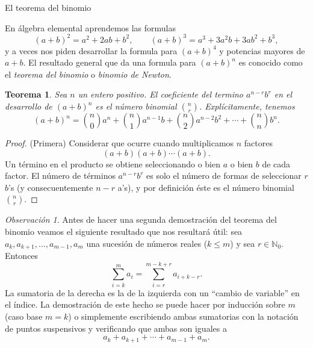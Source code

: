 \documentclass[11pt,spanish,makeidx]{amsbook}
\newtheorem{teorema}{Teorema}[section]
\theoremstyle{definition}
\theoremstyle{remark}
\newtheorem{observacion}{Observaci\'on}[section]
\begin{document}
\begin{section}{El teorema del binomio}

En álgebra elemental aprendemos las formulas
$$
(a+b)^2 = a^2 +2ab +b^2, \qquad (a+b)^3 = a^3 + 3 a^2b +3ab^2 +
b^3,
$$
y a veces nos piden desarrollar la formula para $(a+b)^4$ y potencias mayores de $a+b$. El resultado general que da una formula para $(a+b)^n$ es conocido como el  {\it {teorema del binomio}} o {\it binomio  de Newton}.  

\begin{teorema}\label{t3.6} Sea $n$ un entero positivo. El coeficiente del termino $a^{n-r}b^r$ en el desarrollo de $(a+b)^n$ es el número binomial $\binom{n}{r}$. Explícitamente, tenemos
$$
(a+b)^n= \binom{n}{0} a^n + \binom{n}{1} a^{n-1}b+ \binom{n}{2}
a^{n-2}b^2 + \cdots + \binom{n}{n} b^n.
$$
\end{teorema}
\begin{proof}(Primera) Considerar que ocurre cuando multiplicamos $n$ factores
$$
(a+b)(a+b) \cdots (a+b).
$$
Un término en el producto se obtiene seleccionando o bien $a$ o bien $ b$ de cada factor. El número de términos $a^{n-r}b^r$ es solo el número de formas de seleccionar $r$ $b$'s (y consecuentemente $n-r$ a's), y por definición éste es el número binomial $\binom{n}{r}$.
\end{proof}

\begin{observacion}\label{cvar} Antes de hacer una segunda demostración del teorema del binomio veamos el siguiente resultado que nos resultará útil: sea $a_k,a_{k+1},\ldots,a_{m-1},a_m$ una sucesión de números reales ($k \le m$) y sea $r \in \mathbb N_0$.  Entonces
$$
\sum_{i=k}^m a_i = \sum_{i=r}^{m-k+r} a_{i+k-r}.
$$ 
La sumatoria de la derecha es la de la izquierda con un ``cambio de variable'' en el índice. La demostración de este hecho se puede hacer por inducción sobre $m$ (caso base $m=k$) o simplemente escribiendo ambas sumatorias con la notación de puntos suspensivos y verificando que ambas son iguales a
$$
a_k+a_{k+1}+\cdots+a_{m-1}+a_m.
$$  
\end{observacion}


\end{section}
\end{document}
